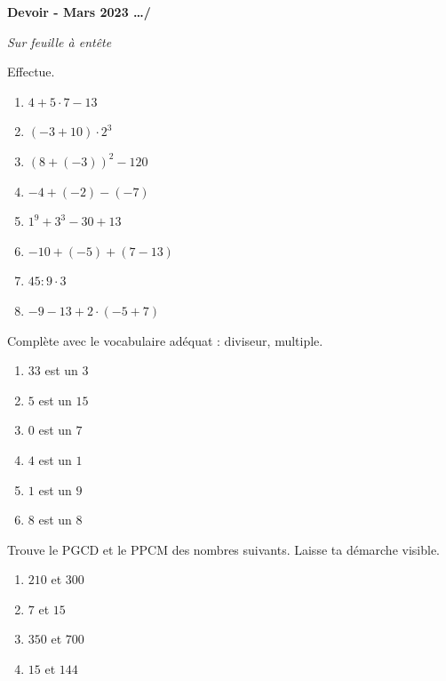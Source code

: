 \documentclass[12pt,parskip=half-, twoside=semi]{scrartcl}
\newcommand{\montitre}{Devoir - Mars 2023}
\begin{document}
\begin{huge}
    \bfseries
    \montitre
    \hfill
    \dots/
    \bigbreak
\end{huge}

\emph{Sur feuille à entête}

\begin{exercise}[points=8]
	Effectue. 
	\begin{enumerate}[cols=2, itemsep=.2cm]
		\item \(4+5\cdot 7-13\)
		\item \(\left(-3+10\right)\cdot 2^3\)
		\item \(\left(8+(-3)\right)^2 - 120\)
		\item \(-4+(-2)-(-7)\)
		\item \(1^9 + 3^3 - 30 + 13\)
		\item \(-10+(-5) + \left(7-13\right)\)
		\item \(45:9\cdot 3 \)
		\item \(-9-13+2\cdot (-5+7)\)
	\end{enumerate}	
\end{exercise}

\begin{exercise}[points=6]
	Complète avec le vocabulaire adéquat : diviseur, multiple.
	\begin{enumerate}[cols=3, itemsep=.5cm]
		\item \(33\) est un  \dotfill \(3\)
		\item \(5\) est un  \dotfill \(15\)
		\item \(0\) est un  \dotfill \(7\)
		\item \(4\) est un  \dotfill \(1\)
		\item \(1\) est un  \dotfill \(9\)
		\item \(8\) est un  \dotfill \(8\)
	\end{enumerate}
\end{exercise}

\begin{exercise}[points=4]
    Trouve le PGCD et le PPCM des nombres suivants. Laisse ta démarche visible.
    \begin{enumerate}[cols=4]
        \item $210$ et $300$
        \item $7 $ et $ 15$
        \item $350$ et $700$
        \item $15$ et $144$
    \end{enumerate}
\end{exercise}
\end{document}
